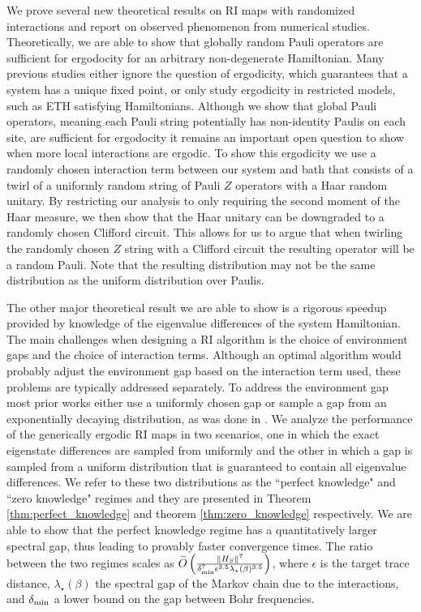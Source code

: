 \documentclass[
 amsmath,amssymb,
 aps,
onecolumn, 
nofootinbib]{revtex4-2}
\begin{document}
We prove several new theoretical results on RI maps with randomized interactions and report on observed phenomenon from numerical studies. Theoretically, we are able to show that globally random Pauli operators are sufficient for ergodocity for an arbitrary non-degenerate Hamiltonian. Many previous studies either ignore the question of ergodicity, which guarantees that a system has a unique fixed point, or only study ergodicity in restricted models, such as ETH satisfying Hamiltonians. Although we show that global Pauli operators, meaning each Pauli string potentially has non-identity Paulis on each site, are sufficient for ergodocity it remains an important open question to show when more local interactions are ergodic. To show this ergodicity we use a randomly chosen interaction term between our system and bath that consists of a twirl of a uniformly random string of Pauli $Z$ operators with a Haar random unitary. By restricting our analysis to only requiring the second moment of the Haar measure, we then show that the Haar unitary can be downgraded to a randomly chosen Clifford circuit. This allows for us to argue that when twirling the randomly chosen $Z$ string with a Clifford circuit the resulting operator will be a random Pauli. Note that the resulting distribution may not be the same distribution as the uniform distribution over Paulis.

The other major theoretical result we are able to show is a rigorous speedup provided by knowledge of the eigenvalue differences of the system Hamiltonian. The main challenges when designing a RI algorithm is the choice of environment gaps and the choice of interaction terms. Although an optimal algorithm would probably adjust the environment gap based on the interaction term used, these problems are typically addressed separately. To address the environment gap most prior works either use a uniformly chosen gap or sample a gap from an exponentially decaying distribution, as was done in \cite{shtanko2023preparingthermalstatesnoiseless}. We analyze the performance of the generically ergodic RI maps in two scenarios, one in which the exact eigenstate differences are sampled from uniformly and the other in which a gap is sampled from a uniform distribution that is guaranteed to contain all eigenvalue differences. We refer to these two distributions as the ``perfect knowledge" and ``zero knowledge" regimes and they are presented in Theorem \ref{thm:perfect_knowledge} and theorem \ref{thm:zero_knowledge} respectively.  We are able to show that the perfect knowledge regime has a quantitatively larger spectral gap, thus leading to provably faster convergence times. The ratio between the two regimes scales as $\widetilde{O}
\left({\frac{\|{H_S}\|^7}{\delta_{\rm min}^7 \epsilon^{3.5}
\lambda_\star(\beta)^{3.5}}}\right)$, where $\epsilon$ is the target trace distance, $\lambda_\star(\beta)$ the spectral gap of the Markov chain due to the interactions, and $\delta_{\rm min}$ a lower bound on the gap between Bohr frequencies. 
\end{document}
